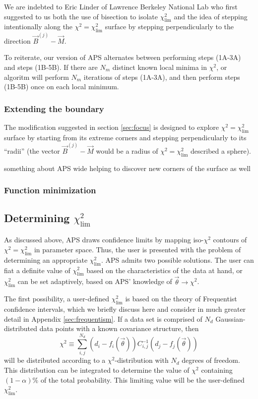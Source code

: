 \documentclass[useAMS,usenatbib]{aastex}
\begin{document}
We are indebted to Eric Linder of Lawrence Berkeley National Lab who first suggested to us
both the use of bisection to isolate $\chi^2_\text{lim}$ and the idea of stepping
intentionally along the $\chi^2=\chi^2_\text{lim}$ surface by stepping perpendicularly to the
direction $\vec{B}^{(j)}-\vec{M}$.

To reiterate, our version of APS alternates between performing steps (1A-3A) and steps
(1B-5B).  If there are $N_m$ distinct known local minima in $\chi^2$, or algoritm will perform
$N_m$ iterations of steps (1A-3A), and then perform steps (1B-5B) once on each local minimum.

\subsubsection{Extending the boundary}
\label{sec:unitSphere}

The modification suggested in section \ref{sec:focus} is designed to explore 
$\chi^2=\chi^2_\text{lim}$ surface by starting from its extreme corners and stepping
perpendicularly to its ``radii'' (the vector $\vec{B}^{(j)}-\vec{M}$ would be a radius of
$\chi^2=\chi^2_\text{lim}$ described a sphere).

something about APS wide helping to discover new corners of the surface as well

\subsubsection{Function minimization}
\label{sec:simplex}

\subsection{Determining $\chi^2_\text{lim}$}
\label{sec:chi}

As discussed above, APS draws confidence limits by mapping
iso-$\chi^2$ contours of $\chi^2=\chi^2_\text{lim}$ in parameter space.
Thus, the user is presented with the problem of determining an
appropriate $\chi^2_\text{lim}$.  APS admits two possible solutions.
The user can fiat a definite value of $\chi^2_\text{lim}$
based on the characteristics of the data at hand,
or $\chi^2_\text{lim}$ can be set adaptively, based on APS'
knowledge of $\vec{\theta}\rightarrow\chi^2$.

The first possibility, a user-defined $\chi^2_\text{lim}$ is based
on the theory of Frequentist confidence intervals, which we briefly discuss
here and consider in much greater detail in Appendix \ref{sec:frequentism}.
If a data set is comprised of $N_d$ Gaussian-distributed data points
with a known covariance structure, then 
\begin{equation}
\chi^2\equiv\sum_{i,j}^{N_d}(d_i-f_i(\vec{\theta}))C^{-1}_{i,j}
(d_j-f_j(\vec{\theta}))
\end{equation}
will be distributed according to a $\chi^2$-distribution with $N_d$ degrees
of freedom.  This distribution can be integrated to determine the value
of $\chi^2$ containing $(1-\alpha)\%$ of the total probability.  This limiting
value will be the user-defined $\chi^2_\text{lim}$.
\end{document}
